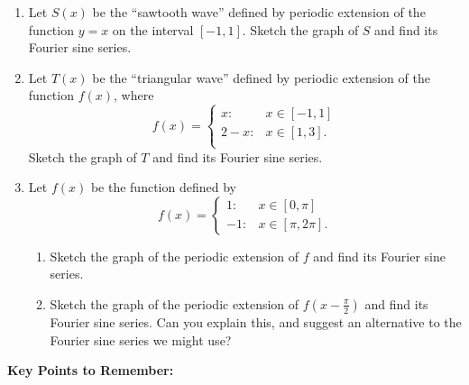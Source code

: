 \documentclass{article}
\begin{document}
\begin{enumerate}
	\item Let $S(x)$ be the ``sawtooth wave'' defined by periodic extension of the function $y=x$ on the interval $[-1,1]$. Sketch the graph of $S$ and find its Fourier sine series.
	\item Let $T(x)$ be the ``triangular wave'' defined by periodic extension of the function $f(x)$, where
		\[f(x)=\begin{cases}
				x: & x\in [-1,1]\\
				2-x: & x\in [1,3].\\
			\end{cases}\]
		Sketch the graph of $T$ and find its Fourier sine series.
	\item Let $f(x)$ be the function defined by
		\[f(x)=\begin{cases}
				1: & x\in [0,\pi]\\
				-1: & x\in[\pi,2\pi].
			\end{cases}\]
		\begin{enumerate}
			\item Sketch the graph of the periodic extension of $f$ and find its Fourier sine series.
			\item Sketch the graph of the periodic extension of $f\left(x-\frac{\pi}{2}\right)$ and find its Fourier sine series. Can you explain this, and suggest an alternative to the Fourier sine series we might use?
		\end{enumerate}
\end{enumerate}


















\clearpage




{\bf Key Points to Remember:}

\vspace{5mm}
\end{document}
